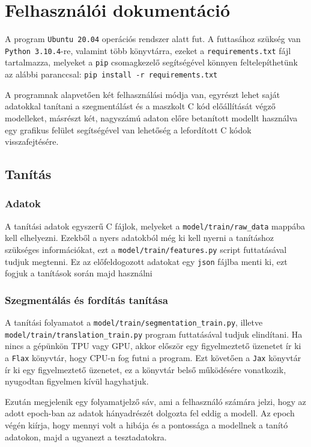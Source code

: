 \chapter{Felhasználói dokumentáció}
\label{ch:user}

A program \texttt{Ubuntu 20.04} operációs rendszer alatt fut. A futtasához szükség van \texttt{Python 3.10.4}-re, valamint több könyvtárra, ezeket a \texttt{requirements.txt} fájl tartalmazza, melyeket a \texttt{pip} csomagkezelő segítségével könnyen feltelepíthetünk az alábbi paranccsal: \texttt{pip install -r requirements.txt}

A programnak alapvetően két felhasználási módja van, egyrészt lehet saját
adatokkal tanítani a szegmentálást és a maszkolt C kód előállítását végző
modelleket, másrészt két, nagyszámú adaton előre betanított modellt használva
egy grafikus felület segítségével van lehetőség a lefordított C kódok
visszafejtésére.

\section{Tanítás}
\subsection{Adatok}
A tanítási adatok egyszerű C fájlok, melyeket a \texttt{model/train/raw\_data}
mappába kell elhelyezni. Ezekből a nyers adatokból még ki kell nyerni
a tanításhoz szükséges információkat, ezt a \texttt{model/train/features.py}
script futtatásával tudjuk megtenni. Ez az előfeldogozott adatokat egy
\texttt{json} fájlba menti ki, ezt fogjuk a tanítások során majd használni

\subsection{Szegmentálás és fordítás tanítása}
A tanítási folyamatot a \texttt{model/train/segmentation\_train.py}, illetve
\texttt{model/train/translation\_train.py} program
futtatásával tudjuk elindítani. Ha nincs a gépünkön TPU vagy GPU, akkor először
egy figyelmeztető üzenetet ír ki a \texttt{Flax} könyvtár, hogy CPU-n fog futni
a program. Ezt követően a \texttt{Jax} könyvtár ír ki egy figyelmeztető
üzenetet, ez a könyvtár belső működésére vonatkozik, nyugodtan figyelmen kívül
hagyhatjuk.

Ezután megjelenik egy folyamatjelző sáv, ami a felhasználó számára
jelzi, hogy az adott epoch-ban az adatok hányadrészét dolgozta fel eddig
a modell. Az epoch végén kiírja, hogy mennyi volt a hibája és a pontossága
a modellnek a tanító adatokon, majd a ugyanezt a tesztadatokra.


